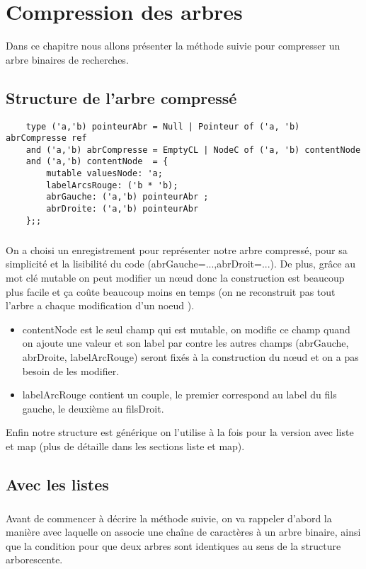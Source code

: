 \chapter{Compression des arbres}
Dans ce chapitre nous allons présenter la méthode suivie pour compresser un arbre binaires de recherches.
\section{Structure de l'arbre compressé}
\begin{verbatim} 
    type ('a,'b) pointeurAbr = Null | Pointeur of ('a, 'b) abrCompresse ref
    and ('a,'b) abrCompresse = EmptyCL | NodeC of ('a, 'b) contentNode
    and ('a,'b) contentNode  = { 
        mutable valuesNode: 'a;
        labelArcsRouge: ('b * 'b); 
        abrGauche: ('a,'b) pointeurAbr ; 
        abrDroite: ('a,'b) pointeurAbr 
    };;
\end{verbatim}
\paragraph{}
On a choisi un enregistrement pour représenter notre arbre compressé, pour sa simplicité et la lisibilité du code (abrGauche=...,abrDroit=...). De plus, grâce au mot clé mutable on peut modifier un nœud donc la construction est beaucoup plus facile et ça coûte beaucoup moins en temps (on ne reconstruit pas tout l’arbre a chaque modification d'un noeud ).
\begin{itemize}
    \item contentNode est le seul champ qui est mutable, on modifie ce champ quand on ajoute une valeur et son label par contre les autres champs (abrGauche, abrDroite, labelArcRouge) seront fixés à la construction du nœud  et on a pas besoin de les modifier.
    \item labelArcRouge contient un couple, le premier correspond au label du fils gauche, le deuxième au filsDroit.
\end{itemize}

Enfin notre structure est générique on l’utilise à la fois pour la version avec liste et map (plus de détaille dans les sections liste et map). 


\section{Avec les listes}
    \paragraph{}
    Avant de commencer à décrire la méthode suivie, on va rappeler d'abord la manière avec laquelle on associe une chaîne de caractères à un arbre binaire, ainsi que la condition pour que deux arbres sont identiques au sens de la structure arborescente.  
